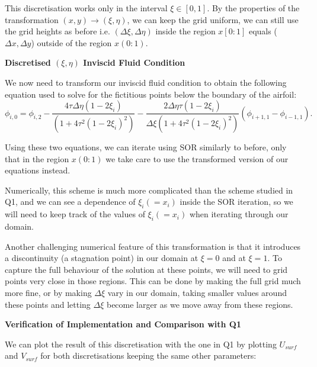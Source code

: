 \documentclass[12pt]{article}
\begin{document}
    This discretisation works only in the interval $\xi \in [0, 1]$. By the properties of the transformation $(x, y) \to (\xi, \eta)$, we can keep the grid uniform, we can still use the grid heights as before i.e. $(\Delta \xi, \Delta \eta)$ inside the region $x[0:1]$ equals ($\Delta x, \Delta y$) outside of the region $x(0:1)$.

    \textbf{Discretised $(\xi, \eta)$ Inviscid Fluid Condition}

    We now need to transform our inviscid fluid condition to obtain the following equation used to solve for the fictitious points below the boundary of the airfoil:
    \begin{equation}
        \phi_{i, 0} = \phi_{i, 2} - \frac{4\tau\Delta \eta (1 - 2\xi_i)}{(1 + 4\tau^2(1 - 2\xi_i)^2)} -  \frac{2\Delta \eta \tau(1-2\xi_i)}{\Delta \xi (1 + 4\tau^2(1 - 2\xi_i)^2)}(\phi_{i+1, 1} - \phi_{i-1, 1}).
    \end{equation}

    Using these two equations, we can iterate using SOR similarly to before, only that in the region $x(0:1)$ we take care to use the transformed version of our equations instead.

    Numerically, this scheme is much more complicated than the scheme studied in Q1, and we can see a dependence of $\xi_i (=x_i)$ inside the SOR iteration, so we will need to keep track of the values of $\xi_i (=x_i) $ when iterating through our domain.

    Another challenging numerical feature of this transformation is that it introduces a discontinuity (a stagnation point) in our domain at $\xi=0$ and at $\xi=1$. To capture the full behaviour of the solution at these points, we will need to grid points very close in those regions. This can be done by making the full grid much more fine, or by making $\Delta \xi$ vary in our domain, taking smaller values around these points and letting $\Delta \xi$ become larger as we move away from these regions.

    \newpage
    \textbf{Verification of Implementation and Comparison with Q1}

    We can plot the result of this discretisation with the one in Q1 by plotting $U_{surf}$ and $V_{surf}$ for both discretisations keeping the same other parameters:
\end{document}
